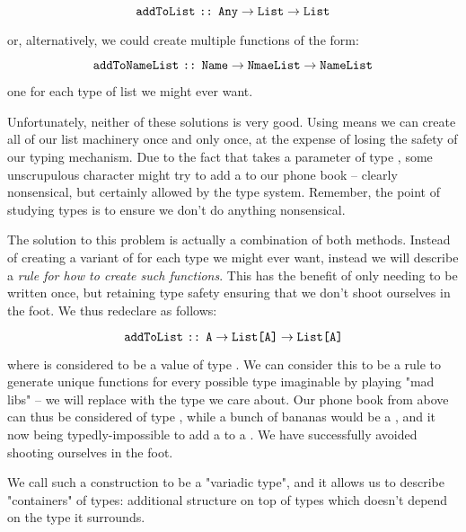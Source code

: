 $$ \text{\texttt{addToList}} \text{ \texttt{::} } \text{\texttt{Any}} \to \text{\texttt{List}} \to \text{\texttt{List}} $$

or, alternatively, we could create multiple functions of the form:

$$ \text{\texttt{addToNameList}} \text{ \texttt{::} } \text{\texttt{Name}} \to \text{\texttt{NmaeList}} \to \text{\texttt{NameList}} $$

one for each type of list we might ever want.

Unfortunately, neither of these solutions is very good. Using  means we can create all of our list
machinery once and only once, at the expense of losing the safety of our typing mechanism. Due to the
fact that  takes a parameter of type , some unscrupulous character might try to add a
 to our phone book -- clearly nonsensical, but certainly allowed by the type system. Remember, the point of
studying types is to ensure we don't do anything nonsensical.

The solution to this problem is actually a combination of both methods. Instead of creating a variant of
 for each type we might ever want, instead we will describe a \textit{rule for how to create such
functions}. This has the benefit of only needing to be written once, but retaining type safety ensuring that we don't
shoot ourselves in the foot. We thus redeclare  as follows:

$$ \text{\texttt{addToList}} \text{ \texttt{::} } \text{\texttt{A}} \to \text{\texttt{List[A]}} \to \text{\texttt{List[A]}} $$

where  is considered to be a value of type . We can consider this to be a rule to generate unique
functions  for every possible type  imaginable by playing "mad libs" -- we will replace 
with the type we care about. Our phone book from above can thus be considered of type , while a bunch
of bananas would be a , and it now being typedly-impossible to add a  to a
. We have successfully avoided shooting ourselves in the foot.

We call such a construction to be a "variadic type", and it allows us to describe "containers" of types: additional
structure on top of types which doesn't depend on the type it surrounds.



